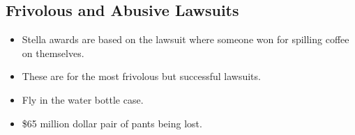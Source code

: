 \documentclass{article}
\begin{document}
\subsection{Frivolous and Abusive Lawsuits}
\begin{itemize}
    \item Stella awards are based on the lawsuit where someone won for spilling coffee on themselves.
    \item These are for the most frivolous but successful lawsuits.
    \item Fly in the water bottle case.
    \item \$65 million dollar pair of pants being lost.
\end{itemize}
\end{document}
